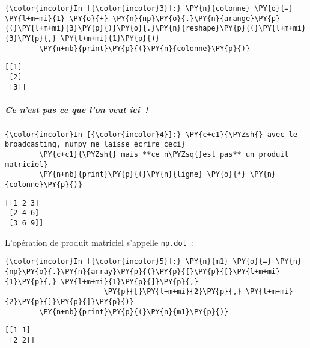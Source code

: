     \begin{Verbatim}[commandchars=\\\{\}]
{\color{incolor}In [{\color{incolor}3}]:} \PY{n}{colonne} \PY{o}{=} \PY{l+m+mi}{1} \PY{o}{+} \PY{n}{np}\PY{o}{.}\PY{n}{arange}\PY{p}{(}\PY{l+m+mi}{3}\PY{p}{)}\PY{o}{.}\PY{n}{reshape}\PY{p}{(}\PY{l+m+mi}{3}\PY{p}{,} \PY{l+m+mi}{1}\PY{p}{)}
        \PY{n+nb}{print}\PY{p}{(}\PY{n}{colonne}\PY{p}{)}
\end{Verbatim}


    \begin{Verbatim}[commandchars=\\\{\}]
[[1]
 [2]
 [3]]

    \end{Verbatim}

    \hypertarget{ce-nest-pas-ce-que-lon-veut-ici}{%
\subparagraph{Ce n'est pas ce que l'on veut
ici~!}\label{ce-nest-pas-ce-que-lon-veut-ici}}

    \begin{Verbatim}[commandchars=\\\{\}]
{\color{incolor}In [{\color{incolor}4}]:} \PY{c+c1}{\PYZsh{} avec le broadcasting, numpy me laisse écrire ceci}
        \PY{c+c1}{\PYZsh{} mais **ce n\PYZsq{}est pas** un produit matriciel}
        \PY{n+nb}{print}\PY{p}{(}\PY{n}{ligne} \PY{o}{*} \PY{n}{colonne}\PY{p}{)}
\end{Verbatim}


    \begin{Verbatim}[commandchars=\\\{\}]
[[1 2 3]
 [2 4 6]
 [3 6 9]]

    \end{Verbatim}

    L'opération de produit matriciel s'appelle \texttt{np.dot}~:

    \begin{Verbatim}[commandchars=\\\{\}]
{\color{incolor}In [{\color{incolor}5}]:} \PY{n}{m1} \PY{o}{=} \PY{n}{np}\PY{o}{.}\PY{n}{array}\PY{p}{(}\PY{p}{[}\PY{p}{[}\PY{l+m+mi}{1}\PY{p}{,} \PY{l+m+mi}{1}\PY{p}{]}\PY{p}{,}
                       \PY{p}{[}\PY{l+m+mi}{2}\PY{p}{,} \PY{l+m+mi}{2}\PY{p}{]}\PY{p}{]}\PY{p}{)}
        \PY{n+nb}{print}\PY{p}{(}\PY{n}{m1}\PY{p}{)}
\end{Verbatim}


    \begin{Verbatim}[commandchars=\\\{\}]
[[1 1]
 [2 2]]

    \end{Verbatim}

